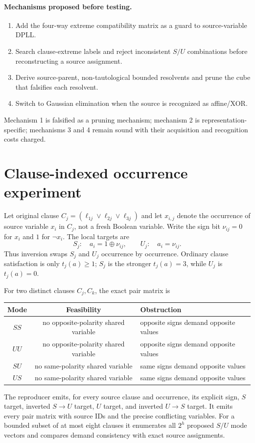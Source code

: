 \documentclass[10pt]{article}
\begin{document}
\paragraph{Mechanisms proposed before testing.}
\begin{enumerate}
\item Add the four-way extreme compatibility matrix as a guard to source-variable DPLL.
\item Search clause-extreme labels and reject inconsistent $S/U$ combinations before
      reconstructing a source assignment.
\item Derive source-parent, non-tautological bounded resolvents and prune the cube that
      falsifies each resolvent.
\item Switch to Gaussian elimination when the source is recognized as affine/XOR.
\end{enumerate}
Mechanism 1 is falsified as a pruning mechanism; mechanism 2 is representation-specific;
mechanisms 3 and 4 remain sound with their acquisition and recognition costs charged.

\section{Clause-indexed occurrence experiment}

Let original clause $C_j=(\ell_{1j}\vee\ell_{2j}\vee\ell_{3j})$ and let
$x_{i,j}$ denote the occurrence of source variable $x_i$ in $C_j$, not a fresh
Boolean variable.  Write the sign bit $\nu_{ij}=0$ for $x_i$ and $1$ for
$\neg x_i$.  The local targets are
\[
 S_j:\quad a_i=1\oplus\nu_{ij},
 \qquad
 U_j:\quad a_i=\nu_{ij}.
\]
Thus inversion swaps $S_j$ and $U_j$ occurrence by occurrence.  Ordinary clause
satisfaction is only $t_j(a)\ge1$; $S_j$ is the stronger $t_j(a)=3$, while $U_j$
is $t_j(a)=0$.

For two distinct clauses $C_j,C_k$, the exact pair matrix is
\begin{center}
\begin{tabular}{ccl}
\toprule
Mode & Feasibility & Obstruction\\
\midrule
$SS$ & no opposite-polarity shared variable & opposite signs demand opposite values\\
$UU$ & no opposite-polarity shared variable & opposite signs demand opposite values\\
$SU$ & no same-polarity shared variable & same signs demand opposite values\\
$US$ & no same-polarity shared variable & same signs demand opposite values\\
\bottomrule
\end{tabular}
\end{center}
The reproducer emits, for every source clause and occurrence, its explicit sign,
$S$ target, inverted $S\to U$ target, $U$ target, and inverted $U\to S$ target.
It emits every pair matrix with source IDs and the precise conflicting variables.
For a bounded subset of at most eight clauses it enumerates all $2^h$ proposed
$S/U$ mode vectors and compares demand consistency with exact source assignments.
\end{document}
